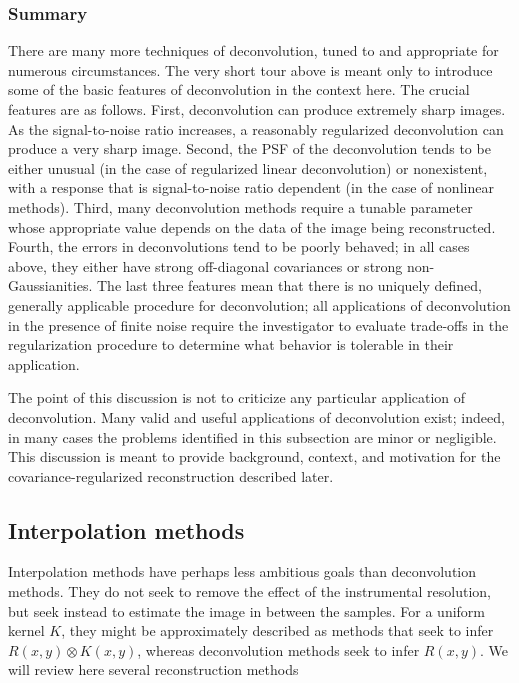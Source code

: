 \documentclass[twocolumn,tighten]{aastex61}
\begin{document}
\subsubsection{Summary}
\label{sec:deconvolution_summary}

There are many more techniques of deconvolution, tuned to and
appropriate for numerous circumstances. The very short tour above is
meant only to introduce some of the basic features of deconvolution in
the context here. The crucial features are as follows. First,
deconvolution can produce extremely sharp images. As the
signal-to-noise ratio increases, a reasonably regularized
deconvolution can produce a very sharp image. Second, the PSF of the
deconvolution tends to be either unusual (in the case of regularized
linear deconvolution) or nonexistent, with a response that is
signal-to-noise ratio dependent (in the case of nonlinear methods).
Third, many deconvolution methods require a tunable parameter whose
appropriate value depends on the data of the image being
reconstructed. Fourth, the errors in deconvolutions tend to be poorly
behaved; in all cases above, they either have strong off-diagonal
covariances or strong non-Gaussianities. The last three features mean
that there is no uniquely defined, generally applicable procedure for
deconvolution; all applications of deconvolution in the presence of
finite noise require the investigator to evaluate trade-offs in the
regularization procedure to determine what behavior is tolerable in
their application.

The point of this discussion is not to criticize any particular
application of deconvolution. Many valid and useful applications of
deconvolution exist; indeed, in many cases the problems identified in
this subsection are minor or negligible. This discussion is meant to
provide background, context, and motivation for the
covariance-regularized reconstruction described later.

\subsection{Interpolation methods}
\label{subsec:reconstructions}

Interpolation methods have perhaps less ambitious goals than
deconvolution methods. They do not seek to remove the effect of the
instrumental resolution, but seek instead to estimate the image in
between the samples. For a uniform kernel $K$, they might be
approximately described as methods that seek to infer $R(x,y)\otimes
K(x,y)$, whereas deconvolution methods seek to infer $R(x,y)$. We will
review here several reconstruction methods
\end{document}
